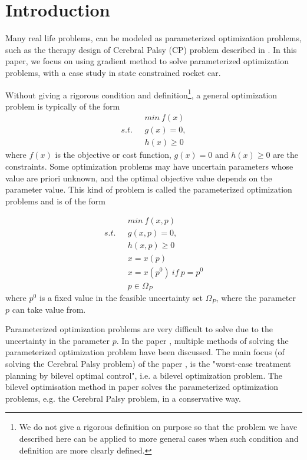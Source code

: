 

\chapter{Introduction}

Many real life problems, can be modeled as parameterized optimization problems, such as the therapy design of Cerebral Palsy (CP) problem described in \cite{MatSch22}. In this paper, we focus on using gradient method to solve parameterized optimization problems, with a case study in state constrained rocket car. 

Without giving a rigorous condition and definition\footnote{We do not give a rigorous definition on purpose so that the problem we have described here can be applied to more general cases when such condition and definition are more clearly defined.},  a general optimization problem is typically of the form
\begin{equation}
	\begin{aligned}
		 \  \  \ & min \  f(x) \\
		s.t.  \  \  \ & g(x) = 0, \\ 
		              &  h(x)  \geq  0 
	\end{aligned}
    \label{GeneralMin}
\end{equation}
where $f(x)$ is the objective or cost function, $g(x) = 0$ and $h(x)  \geq  0$ are the constraints. Some optimization problems may have uncertain parameters whose value are priori unknown, and the optimal objective value depends on the parameter value. This kind of problem is called the parameterized optimization problems and is of the form 


\begin{equation}
	\begin{aligned}
		\  \  \ & min \  f(x, p) \\
		s.t.  \  \  \ & g(x, p) = 0, \\ 
		&  h(x,p)  \geq  0  \\ 
		& x = x(p) \\
		& x = x(p^0) \  if \  p = p^0 \\
		& p \in \Omega_P		
	\end{aligned}
    \label{ParaMin}
\end{equation}
where $p^0$ is a fixed value in the feasible uncertainty set $\Omega_P$, where the parameter $p$ can take value from.

Parameterized optimization problems are very difficult to solve due to the uncertainty in the parameter $p$. In the paper \cite{MatSch22}, multiple methods of solving the parameterized optimization problem have been discussed. The main focus (of solving the Cerebral Palsy problem) of the paper \cite{MatSch22}, is the "worst-case treatment planning by bilevel optimal control", i.e. a bilevel optimization problem. The bilevel optimisation method in paper \cite{MatSch22} solves the parameterized optimization problems, e.g. the Cerebral Palsy problem, in a conservative way.


